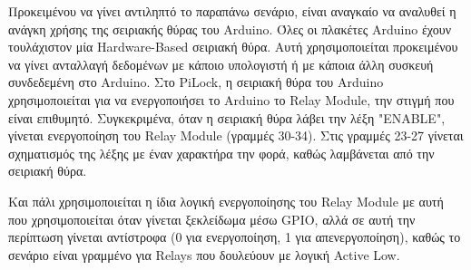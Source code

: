 	Προκειμένου να γίνει αντιληπτό το παραπάνω σενάριο, είναι αναγκαίο να αναλυθεί η ανάγκη χρήσης της σειριακής θύρας του Arduino. Όλες οι πλακέτες Arduino έχουν τουλάχιστον μία Hardware-Based σειριακή θύρα. Αυτή χρησιμοποιείται προκειμένου να γίνει ανταλλαγή δεδομένων με κάποιο υπολογιστή ή με κάποια άλλη συσκευή συνδεδεμένη στο Arduino. Στο PiLock, η σειριακή θύρα του Arduino χρησιμοποιείται για να ενεργοποιήσει το Arduino το Relay Module, την στιγμή που είναι επιθυμητό. Συγκεκριμένα, όταν η σειριακή θύρα λάβει την λέξη "ENABLE", γίνεται ενεργοποίηση του Relay Module (γραμμές 30-34). Στις γραμμές 23-27 γίνεται σχηματισμός της λέξης με έναν χαρακτήρα την φορά, καθώς λαμβάνεται από την σειριακή θύρα.

	Και πάλι χρησιμοποιείται η ίδια λογική ενεργοποίησης του Relay Module με αυτή που χρησιμοποιείται όταν γίνεται ξεκλείδωμα μέσω GPIO, αλλά σε αυτή την περίπτωση γίνεται αντίστροφα (0 για ενεργοποίηση, 1 για απενεργοποίηση), καθώς το σενάριο είναι γραμμένο για Relays που δουλεύουν με λογική Active Low.

	